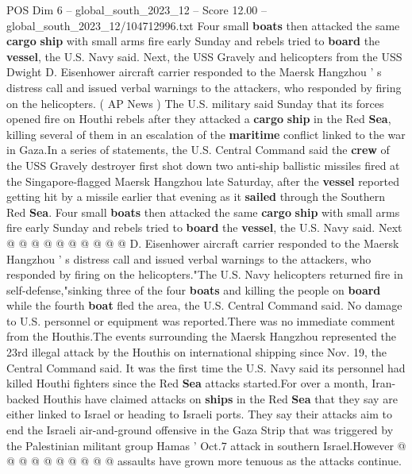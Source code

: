 \begin{textsample}{POS Dim 6 – global\_south\_2023\_12 – Score 12.00 – global\_south\_2023\_12/104712996.txt}  \label{ex:f6_pos_102}
Four small \textbf{boats} then attacked the same \textbf{cargo} \textbf{ship} with small arms fire early Sunday and rebels tried to \textbf{board} the \textbf{vessel}, the U.S.
Navy said.
Next, the USS Gravely and helicopters from the USS Dwight D.
Eisenhower aircraft carrier responded to the Maersk Hangzhou ' s distress call and issued verbal warnings to the attackers, who responded by firing on the helicopters. ( AP News ) The U.S. military said Sunday that its forces opened fire on Houthi rebels after they attacked a \textbf{cargo} \textbf{ship} in the Red \textbf{Sea}, killing several of them in an escalation of the \textbf{maritime} conflict linked to the war in Gaza.In a series of statements, the U.S.
Central Command said the \textbf{crew} of the USS Gravely destroyer first shot down two anti-ship ballistic missiles fired at the Singapore-flagged Maersk Hangzhou late Saturday, after the \textbf{vessel} reported getting hit by a missile earlier that evening as it \textbf{sailed} through the Southern Red \textbf{Sea}.
Four small \textbf{boats} then attacked the same \textbf{cargo} \textbf{ship} with small arms fire early Sunday and rebels tried to \textbf{board} the \textbf{vessel}, the U.S.
Navy said.
Next @ @ @ @ @ @ @ @ @ @ D.
Eisenhower aircraft carrier responded to the Maersk Hangzhou ' s distress call and issued verbal warnings to the attackers, who responded by firing on the helicopters."The U.S.
Navy helicopters returned fire in self-defense,"sinking three of the four \textbf{boats} and killing the people on \textbf{board} while the fourth \textbf{boat} fled the area, the U.S.
Central Command said.
No damage to U.S. personnel or equipment was reported.There was no immediate comment from the Houthis.The events surrounding the Maersk Hangzhou represented the 23rd illegal attack by the Houthis on international shipping since Nov. 19, the Central Command said.
It was the first time the U.S.
Navy said its personnel had killed Houthi fighters since the Red \textbf{Sea} attacks started.For over a month, Iran-backed Houthis have claimed attacks on \textbf{ships} in the Red \textbf{Sea} that they say are either linked to Israel or heading to Israeli ports.
They say their attacks aim to end the Israeli air-and-ground offensive in the Gaza Strip that was triggered by the Palestinian militant group Hamas ' Oct.7 attack in southern Israel.However @ @ @ @ @ @ @ @ @ @ assaults have grown more tenuous as the attacks continue.

\end{textsample}
